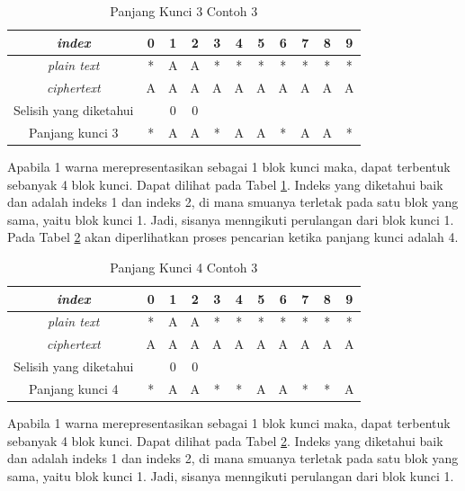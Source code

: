	\begin{table}[H]
	 	\centering
	 	\caption{Panjang Kunci 3 Contoh 3}
	 	\setlength{\arrayrulewidth}{.08em}
	 	\begin{tabular}{|c|c|c|c|c|c|c|c|c|c|c|}\hline
	 	\textit{index}&0&1&2&3&4&5&6&7&8&9\\ \hline
	 	\textit{plain text}&\cellcolor{blue!15}*&\cellcolor{blue!15}A&\cellcolor{blue!15}A&\cellcolor{blue!15}*&\cellcolor{green!15}*&\cellcolor{green!15}*&\cellcolor{green!15}*&\cellcolor{green!15}*&\cellcolor{violet!30}*&\cellcolor{violet!30}*\\ \hline
	 	\textit{ciphertext}&\cellcolor{blue!15}A&\cellcolor{blue!15}A&\cellcolor{blue!15}A&\cellcolor{blue!15}A&\cellcolor{green!15}A&\cellcolor{green!15}A&\cellcolor{green!15}A&\cellcolor{green!15}A&\cellcolor{violet!30}A&\cellcolor{violet!30}A\\ \hline
		Selisih yang diketahui & &0&0& & & & & & & \\ \hline	
		Panjang kunci 3 &*&A&A&*&A&A&*&A&A&*\\ \hline 	
	 	\end{tabular}
	 	\label{tab:k3contoh3}
	\end{table}
	Apabila 1 warna merepresentasikan sebagai 1 blok kunci maka, dapat terbentuk sebanyak 4 blok kunci. Dapat dilihat pada Tabel \ref{tab:k3contoh3}. Indeks yang diketahui baik \plaintext dan \ciphertext adalah indeks 1 dan indeks 2, di mana smuanya terletak pada satu blok yang sama, yaitu blok kunci 1. Jadi, sisanya menngikuti perulangan dari blok kunci 1. 
	\\
	Pada Tabel \ref{tab:k4contoh3} akan diperlihatkan proses pencarian ketika panjang kunci adalah 4.
	\begin{table}[H]
	 	\centering
	 	\caption{Panjang Kunci 4 Contoh 3}
	 	\setlength{\arrayrulewidth}{.08em}
	 	\begin{tabular}{|c|c|c|c|c|c|c|c|c|c|c|}\hline
	 	\textit{index}&0&1&2&3&4&5&6&7&8&9\\ \hline
	 	\textit{plain text}&\cellcolor{blue!15}*&\cellcolor{blue!15}A&\cellcolor{blue!15}A&\cellcolor{green!15}*&\cellcolor{green!15}*&\cellcolor{green!15}*&\cellcolor{violet!30}*&\cellcolor{violet!30}*&\cellcolor{violet!30}*&\cellcolor{purple!25}*\\ \hline
	 	\textit{ciphertext}&\cellcolor{blue!15}A&\cellcolor{blue!15}A&\cellcolor{blue!15}A&\cellcolor{green!15}A&\cellcolor{green!15}A&\cellcolor{green!15}A&\cellcolor{violet!30}A&\cellcolor{violet!30}A&\cellcolor{violet!30}A&\cellcolor{purple!25}A\\ \hline
		Selisih yang diketahui & &0&0& & & & & & & \\ \hline	
		Panjang kunci 4 &*&A&A&*&*&A&A&*&*&A\\ \hline 	
	 	\end{tabular}
	 	\label{tab:k4contoh3}
	\end{table}
	Apabila 1 warna merepresentasikan sebagai 1 blok kunci maka, dapat terbentuk sebanyak 4 blok kunci. Dapat dilihat pada Tabel \ref{tab:k4contoh3}. Indeks yang diketahui baik \plaintext dan \ciphertext adalah indeks 1 dan indeks 2, di mana smuanya terletak pada satu blok yang sama, yaitu blok kunci 1. Jadi, sisanya menngikuti perulangan dari blok kunci 1. 
	
